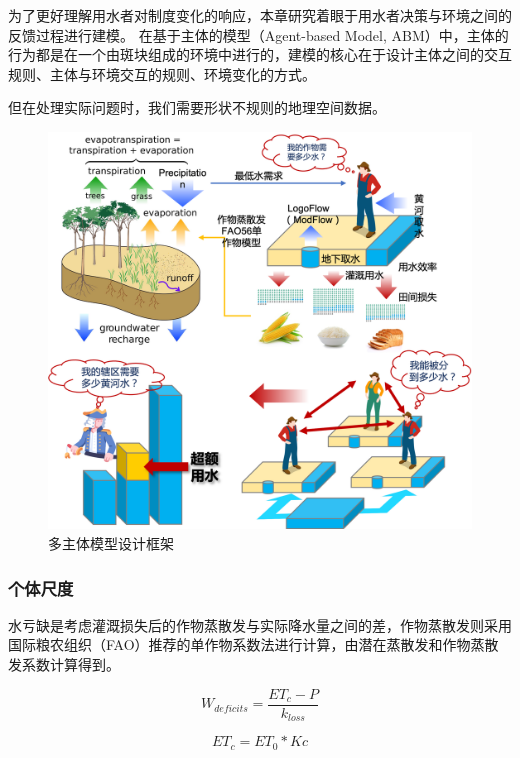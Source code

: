 
为了更好理解用水者对制度变化的响应，本章研究着眼于用水者决策与环境之间的反馈过程进行建模。
在基于主体的模型（Agent-based Model, ABM）中，主体的行为都是在一个由斑块组成的环境中进行的，建模的核心在于设计主体之间的交互规则、主体与环境交互的规则、环境变化的方式。

但在处理实际问题时，我们需要形状不规则的地理空间数据。


\begin{figure}[htb]
    \centering
    \includegraphics[width=\textwidth]{img/ch6/ch6_framework.png}
    \caption{多主体模型设计框架}\label{ch6:fig:framework}
\end{figure}

\subsubsection*{个体尺度}

水亏缺是考虑灌溉损失后的作物蒸散发与实际降水量之间的差，作物蒸散发则采用国际粮农组织（FAO）推荐的单作物系数法进行计算，由潜在蒸散发和作物蒸散发系数计算得到。

\begin{equation}
    \label{ch6:eq:deficits}
    W_{deficits} = \frac{ET_c - P}{k_{loss}}
\end{equation}

\begin{equation}
    \label{ch6:eq:etc}
    ET_c = ET_{0} * Kc
\end{equation}

